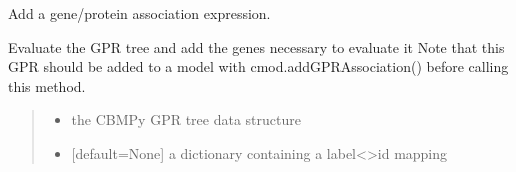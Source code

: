 \documentclass[letterpaper,12pt,english]{sphinxmanual}
\begin{document}
\begin{fulllineitems}
\begin{fulllineitems}
\begin{quote}
\begin{description}
\end{description}\end{quote}

\end{fulllineitems}


\begin{fulllineitems}
\label{\detokenize{api/core:cbmpy.CBModel.GeneProteinAssociation.addAssociation}}
\pysigstartsignatures
\pysiglinewithargsret
{}
{}
{}
\pysigstopsignatures
\sphinxAtStartPar
Add a gene/protein association expression.

\end{fulllineitems}


\begin{fulllineitems}
\label{\detokenize{api/core:cbmpy.CBModel.GeneProteinAssociation.createAssociationAndGeneRefsFromTree}}
\pysigstartsignatures
\pysiglinewithargsret
{}
{\sphinxparamcomma {}}
{}
\pysigstopsignatures
\sphinxAtStartPar
Evaluate the GPR tree and add the genes necessary to evaluate it Note that this GPR should be added to a model with cmod.addGPRAssociation() before calling this method.
\begin{quote}\begin{description}
\begin{itemize}
\item {} 
\sphinxAtStartPar
{} \textendash{} the CBMPy GPR tree data structure

\item {} 
\sphinxAtStartPar
{} \textendash{} {[}default=None{]} a dictionary containing a label\textless{}\textendash{}\textgreater{}id mapping

\end{itemize}


\end{description}
\end{quote}
\end{fulllineitems}
\end{fulllineitems}
\end{document}
